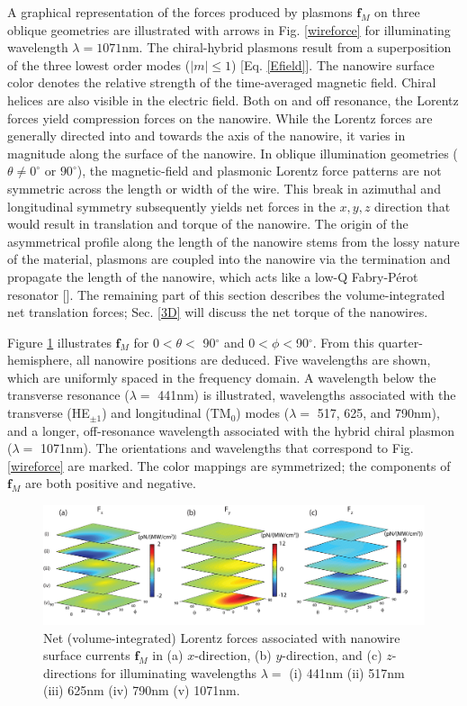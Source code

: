 A graphical representation of the forces produced by plasmons $\mathbf{f}_M$ on three oblique geometries are illustrated with arrows in Fig. \ref{wireforce} for illuminating wavelength $\lambda = 1071$nm. The chiral-hybrid plasmons result from a superposition of the three lowest order modes ($|m|\leq 1$) [Eq. \ref{Efield}]. The nanowire surface color denotes the relative strength of the time-averaged magnetic field.  Chiral helices are also visible in the electric field. Both on and off resonance, the Lorentz forces yield compression forces on the nanowire.  While the Lorentz forces are generally directed into and towards the axis of the nanowire, it varies in magnitude along the surface of the nanowire. In oblique illumination geometries ($\theta \neq 0^\circ$ or $90^\circ$), the magnetic-field and plasmonic Lorentz force patterns are not symmetric across the length or width of the wire. This break in azimuthal and longitudinal symmetry subsequently yields net forces in the $x, y, z$ direction that would result in translation and torque of the nanowire. The origin of the asymmetrical profile along the length of the nanowire stems from the lossy nature of the material, plasmons are coupled into the nanowire via the termination and propagate the length of the nanowire, which acts like a low-Q Fabry-P\'{e}rot resonator [\cite{Ditlbacher}]. The remaining part of this section describes the volume-integrated net translation forces; Sec. \ref{3D} will discuss the net torque of the nanowires.

Figure \ref{FxFyFz} illustrates $\mathbf{f}_M$ for $0<\theta<$ 90$^\circ$ and $0<\phi< $90$^\circ$. From this quarter-hemisphere, all nanowire positions are deduced.  Five wavelengths are shown, which are uniformly spaced in the frequency domain.  A wavelength below the transverse resonance ($\lambda =$ 441nm) is illustrated, wavelengths associated with the transverse (HE$_{\pm 1}$) and longitudinal (TM$_0$) modes ($\lambda =$ 517, 625, and 790nm), and a longer, off-resonance wavelength associated with the hybrid chiral plasmon ($\lambda =$ 1071nm).  The orientations and wavelengths that correspond to Fig. \ref{wireforce} are marked.  The color mappings are symmetrized; the components of $\mathbf{f}_M$ are both positive and negative.

\begin{figure}[t!]
\centering\includegraphics[width = \textwidth]{AllF.png}
\caption{Net (volume-integrated) Lorentz forces associated with nanowire surface currents $\mathbf{f}_M$ in (a) $x$-direction, (b) $y$-direction, and (c) $z$-directions for illuminating wavelengths $\lambda = $ (i) 441nm (ii) 517nm (iii) 625nm (iv) 790nm (v) 1071nm.}\label{FxFyFz}
\end{figure}

